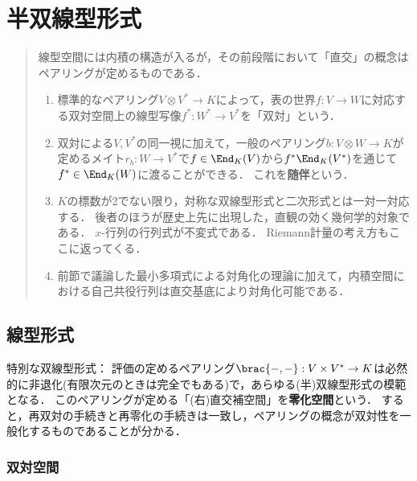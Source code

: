 \documentclass[uplatex, dvipdfmx]{jsreport}
\begin{document}
\chapter{半双線型形式}

\begin{quotation}
    線型空間には内積の構造が入るが，その前段階において「直交」の概念はペアリングが定めるものである．
    \begin{enumerate}
        \item 標準的なペアリング$V\otimes V^*\to K$によって，表の世界$f:V\to W$に対応する双対空間上の線型写像$f^*:W^*\to V^*$を「双対」という．
        \item 双対による$V,V^*$の同一視に加えて，一般のペアリング$b:V\otimes W\to K$が定めるメイト$r_b:W\to V^*$で$f\in\End_K(V)$から$f^*\End_K(V^*)$を通じて$f^*\in\End_K(W)$に渡ることができる．
        これを\textbf{随伴}という．
        \item $K$の標数が2でない限り，対称な双線型形式と二次形式とは一対一対応する．
        後者のほうが歴史上先に出現した，直観の効く幾何学的対象である．
        $x$-行列の行列式が不変式である．
        Riemann計量の考え方もここに返ってくる．
        \item 前節で議論した最小多項式による対角化の理論に加えて，内積空間における自己共役行列は直交基底により対角化可能である．
    \end{enumerate}
\end{quotation}

\section{線型形式}

\begin{tcolorbox}[colframe=ForestGreen, colback=ForestGreen!10!white,breakable,colbacktitle=ForestGreen!40!white,coltitle=black,fonttitle=\bfseries\sffamily,
    title=]
    特別な双線型形式：
    評価の定めるペアリング$\brac{-,-}:V\times V^*\to K$は必然的に非退化(有限次元のときは完全でもある)で，あらゆる(半)双線型形式の模範となる．
    このペアリングが定める「(右)直交補空間」を\textbf{零化空間}という．
    すると，再双対の手続きと再零化の手続きは一致し，ペアリングの概念が双対性を一般化するものであることが分かる．
\end{tcolorbox}

\subsection{双対空間}
\end{document}
